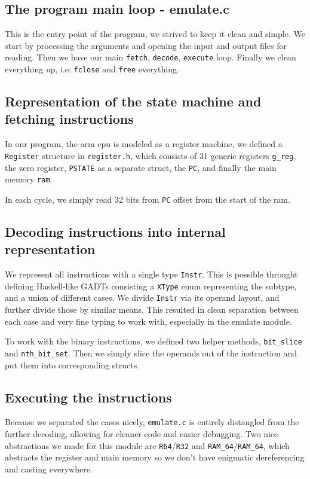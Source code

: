\documentclass[11pt]{article}
\begin{document}
\subsection{The program main loop - emulate.c}
This is the entry point of the program, we strived to keep it clean and simple. 
We start by processing the arguments and opening the input and output files for
reading. Then we have our main \texttt{fetch}, \texttt{decode}, 
\texttt{execute} loop. Finally we clean everything up, i.e: \texttt{fclose} and
\texttt{free} everything.

\subsection{Representation of the state machine and fetching instructions}

In our program, the arm cpu is modeled as a register machine, we defined a
\texttt{Register} structure in \texttt{register.h}, which consists of 31
generic registers \texttt{g\_reg}, the zero register, \texttt{PSTATE} as a
separate struct, the \texttt{PC}, and finally the main memory \texttt{ram}.

In each cycle, we simply read 32 bits from \texttt{PC} offset from the start of
the ram.

\subsection{Decoding instructions into internal representation}

We represent all instructions with a single type \texttt{Instr}. This is 
possible throught defining Haskell-like GADTs consisting a \texttt{XType} enum
representing the subtype, and a union of different cases. We divide
\texttt{Instr} via its operand layout, and further divide those by similar 
means. This resulted in clean separation between each case and very fine typing
to work with, especially in the emulate module.

To work with the binary instructions, we defined two helper methods,
\texttt{bit\_slice} and \texttt{nth\_bit\_set}. Then we simply slice the
operands out of the instruction and put them into corresponding structs.

\subsection{Executing the instructions}
Because we separated the cases nicely, \texttt{emulate.c} is entirely
distangled from the further decoding, allowing for cleaner code and
easier debugging. Two nice abstractions we made for this module are 
\texttt{R64}/\texttt{R32} and \texttt{RAM\_64}/\texttt{RAM\_64}, which 
abstracts the register and main memory so we don't have enigmatic dereferencing
and casting everywhere.
\end{document}

